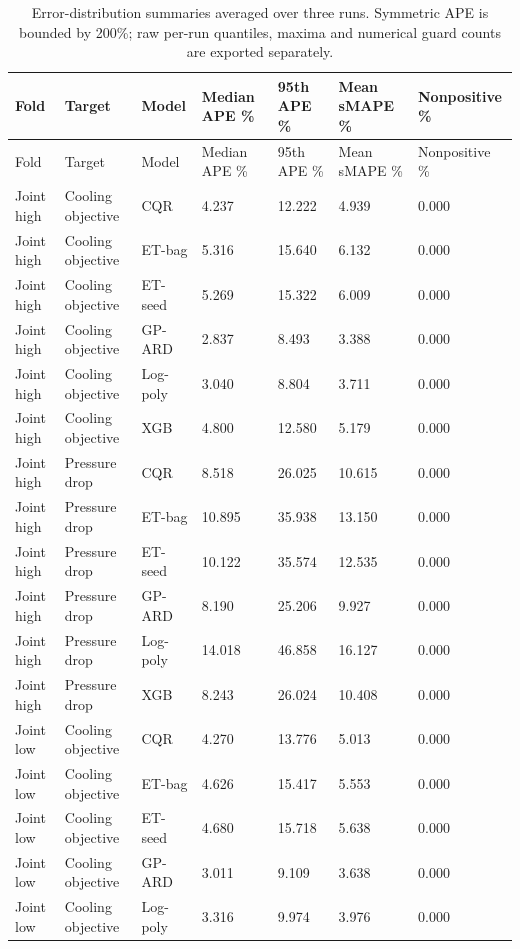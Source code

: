 \begingroup\small\setlength{\tabcolsep}{3pt}\begin{longtable}{lllllll}
\caption{Error-distribution summaries averaged over three runs. Symmetric APE is bounded by 200\%; raw per-run quantiles, maxima and numerical guard counts are exported separately.}\label{tab:ubend-error_distribution}\\\toprule
Fold & Target & Model & Median APE \% & 95th APE \% & Mean sMAPE \% & Nonpositive \%\\\midrule
\endfirsthead\toprule
Fold & Target & Model & Median APE \% & 95th APE \% & Mean sMAPE \% & Nonpositive \%\\\midrule
\endhead
Joint high & Cooling objective & CQR & 4.237 & 12.222 & 4.939 & 0.000\\
Joint high & Cooling objective & ET-bag & 5.316 & 15.640 & 6.132 & 0.000\\
Joint high & Cooling objective & ET-seed & 5.269 & 15.322 & 6.009 & 0.000\\
Joint high & Cooling objective & GP-ARD & 2.837 & 8.493 & 3.388 & 0.000\\
Joint high & Cooling objective & Log-poly & 3.040 & 8.804 & 3.711 & 0.000\\
Joint high & Cooling objective & XGB & 4.800 & 12.580 & 5.179 & 0.000\\
Joint high & Pressure drop & CQR & 8.518 & 26.025 & 10.615 & 0.000\\
Joint high & Pressure drop & ET-bag & 10.895 & 35.938 & 13.150 & 0.000\\
Joint high & Pressure drop & ET-seed & 10.122 & 35.574 & 12.535 & 0.000\\
Joint high & Pressure drop & GP-ARD & 8.190 & 25.206 & 9.927 & 0.000\\
Joint high & Pressure drop & Log-poly & 14.018 & 46.858 & 16.127 & 0.000\\
Joint high & Pressure drop & XGB & 8.243 & 26.024 & 10.408 & 0.000\\
Joint low & Cooling objective & CQR & 4.270 & 13.776 & 5.013 & 0.000\\
Joint low & Cooling objective & ET-bag & 4.626 & 15.417 & 5.553 & 0.000\\
Joint low & Cooling objective & ET-seed & 4.680 & 15.718 & 5.638 & 0.000\\
Joint low & Cooling objective & GP-ARD & 3.011 & 9.109 & 3.638 & 0.000\\
Joint low & Cooling objective & Log-poly & 3.316 & 9.974 & 3.976 & 0.000\\

\end{longtable}
